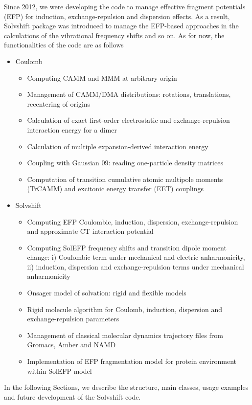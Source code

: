 \documentclass[b5paper,oneside,fleqn,11pt]{book}
\begin{document}
\begin{refsection}
Since 2012, we were developing the code to manage effective fragment
potentials (EFP) for induction, exchange\hyp{}repulsion and dispersion
effects. As a result, {\sc Solvshift} package was introduced
to manage the EFP\hyp{}based approaches in the calculations
of the vibrational frequency shifts and so on. As for now, 
the functionalities of the code are as follows
%
\begin{itemize}
 \item {\sc Coulomb}
  \begin{itemize}
  \item Computing CAMM and MMM at arbitrary origin
  \item Management of CAMM/DMA distributions: rotations, translations, recentering of origins
  \item Calculation of exact first\hyp{}order 
        electrostatic and exchange\hyp{}repulsion interaction energy for a dimer
  \item Calculation of multiple expansion\hyp{}derived interaction energy
  \item Coupling with {\sc Gaussian 09}: reading one\hyp{}particle 
                                        density matrices
  \item Computation of transition cumulative atomic multipole moments (TrCAMM)
        and excitonic energy transfer (EET) couplings \citep{Blasiak.Maj.Cho.Gora.JCTC.2015}
  \end{itemize}
 \item {\sc Solvshift}
  \begin{itemize}
  \item Computing EFP Coulombic, induction, dispersion, exchange\hyp{}repulsion and approximate CT
        interaction potential
  \item Computing SolEFP frequency shifts and transition dipole moment change:
        i) Coulombic term under mechanical and electric anharmonicity, 
        ii) induction, dispersion and exchange\hyp{}repulsion terms under mechanical anharmonicity
  \item Onsager model of solvation: rigid and flexible models
  \item Rigid molecule algorithm for Coulomb, induction, dispersion and exchange\hyp{}repulsion
        parameters
  \item Management of classical molecular dynamics trajectory files from Gromacs, Amber and NAMD
  \item Implementation of EFP fragmentation model for protein environment within SolEFP model
  \end{itemize}
\end{itemize}
%
In the following Sections, we describe the structure, main classes,
usage examples and future development of the {\sc Solvshift} code.


\end{refsection}
\end{document}
